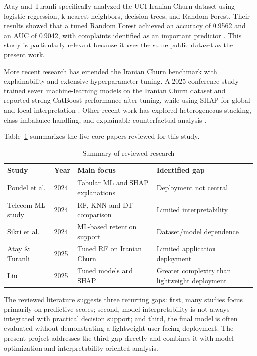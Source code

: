\documentclass[conference]{IEEEtran}
\begin{document}
Atay and Turanli specifically analyzed the UCI Iranian Churn dataset using logistic regression, k-nearest neighbors, decision trees, and Random Forest. Their results showed that a tuned Random Forest achieved an accuracy of 0.9562 and an AUC of 0.9042, with complaints identified as an important predictor \cite{atay2025}. This study is particularly relevant because it uses the same public dataset as the present work.

More recent research has extended the Iranian Churn benchmark with explainability and extensive hyperparameter tuning. A 2025 conference study trained seven machine-learning models on the Iranian Churn dataset and reported strong CatBoost performance after tuning, while using SHAP for global and local interpretation \cite{liu2025}. Other recent work has explored heterogeneous stacking, class-imbalance handling, and explainable counterfactual analysis \cite{hmse2024,counterfactual2025}.

Table~\ref{tab:related} summarizes the five core papers reviewed for this study.

\begin{table}[H]
\centering
\caption{Summary of reviewed research}
\label{tab:related}
\small
\begin{tabular}{p{1.8cm}p{0.65cm}p{2.0cm}p{2.0cm}}
\toprule
Study & Year & Main focus & Identified gap \\
\midrule
Poudel et al. & 2024 & Tabular ML and SHAP explanations & Deployment not central \\
Telecom ML study & 2024 & RF, KNN and DT comparison & Limited interpretability \\
Sikri et al. & 2024 & ML-based retention support & Dataset/model dependence \\
Atay \& Turanli & 2025 & Tuned RF on Iranian Churn & Limited application deployment \\
Liu & 2025 & Tuned models and SHAP & Greater complexity than lightweight deployment \\
\bottomrule
\end{tabular}
\end{table}

The reviewed literature suggests three recurring gaps: first, many studies focus primarily on predictive scores; second, model interpretability is not always integrated with practical decision support; and third, the final model is often evaluated without demonstrating a lightweight user-facing deployment. The present project addresses the third gap directly and combines it with model optimization and interpretability-oriented analysis.
\end{document}
